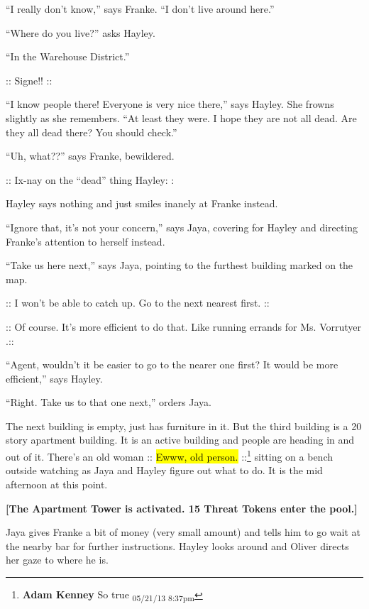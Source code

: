 ``I really don't know,'' says Franke.  ``I don't live around here.''

``Where do you live?'' asks Hayley.

``In the Warehouse District.''

:: {\color[RGB]{230,145,56}Signe!!} ::

``I know people there!  Everyone is very nice there,'' says Hayley.  She frowns slightly as she remembers.  ``At least they were.  I hope they are not all dead.  Are they all dead there?  You should check.''

``Uh, what??'' says Franke, bewildered.

:: {\color[RGB]{106,168,79}Ix-nay on the ``dead'' thing Hayley:} :

Hayley says nothing and just smiles inanely at Franke instead.

``Ignore that, it's not your concern,'' says Jaya, covering for Hayley and directing Franke's attention to herself instead.

``Take us here next,'' says Jaya, pointing to the furthest building marked on the map.

:: {\color[RGB]{106,168,79}I won't be able to catch up.  Go to the next nearest first.} ::

:: {\color[RGB]{230,145,56}Of course.  It's more efficient to do that.  Like running errands for Ms. Vorrutyer} .::

``Agent, wouldn't it be easier to go to the nearer one first?  It would be more efficient,'' says Hayley.

``Right.  Take us to that one next,'' orders Jaya.



The next building is empty, just has furniture in it.  But the third building is a 20 story apartment building.  It is an active building and people are heading in and out of it.  There's an old woman :: {\color[RGB]{230,145,56}\hl{Ewww, old person.}} ::\footnote{\textbf{Adam Kenney }So true \textsubscript{05/21/13 8:37pm}} sitting on a bench outside watching as Jaya and Hayley figure out what to do.    It is the mid afternoon at this point.  



\textbf{{[}The Apartment Tower is activated.  15 Threat Tokens enter the pool.{]}}



Jaya gives Franke a bit of money (very small amount) and tells him to go wait at the nearby bar for further instructions.  Hayley looks around and Oliver directs her gaze to where he is.  

